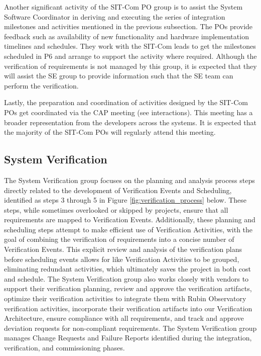 \documentclass[SE,lsstdraft,authoryear,toc]{lsstdoc, lsstdraft}
\begin{document}
Another significant activity of the SIT-Com PO group is to assist the System Software Coordinator in deriving and executing the series of integration milestones and activities mentioned in the previous subsection.
The POs provide feedback such as availability of new functionality and hardware implementation timelines and schedules.
They work with the SIT-Com leads to get the milestones scheduled in P6 and arrange to support the activity where required.
Although the verification of requirements is not managed by this group, it is expected that they will assist the SE group to provide information such that the SE team can perform the verification.

Lastly, the preparation and coordination of activities designed by the SIT-Com POs get coordinated via the CAP meeting (see interactions). This meeting has a broader representation from the developers across the systems. It is expected that the majority of the SIT-Com POs will regularly attend this meeting.

\subsection{System Verification}
The System Verification group focuses on the planning and analysis process steps directly related to the development of Verification Events and Scheduling, identified as steps 3 through 5 in Figure \ref{fig:verification_process} below.
These steps, while sometimes overlooked or skipped by projects, ensure that all requirements are mapped to Verification Events.
Additionally, these planning and scheduling steps attempt to make efficient use of Verification Activities, with the goal of combining the verification of requirements into a concise number of Verification Events. 
This explicit review and analysis of the verification plans before scheduling events allows for like Verification Activities to be grouped, eliminating redundant activities, which ultimately saves the project in both cost and schedule.
The System Verification group also works closely with vendors to support their verification planning, review and approve the verification artifacts, optimize their verification activities to integrate them with Rubin Observatory verification activities, incorporate their verification artifacts into our Verification Architecture, ensure compliance with all requirements, and track and approve deviation requests for non-compliant requirements. 
The System Verification group manages Change Requests and Failure Reports identified during the integration, verification, and commissioning phases.
\end{document}
